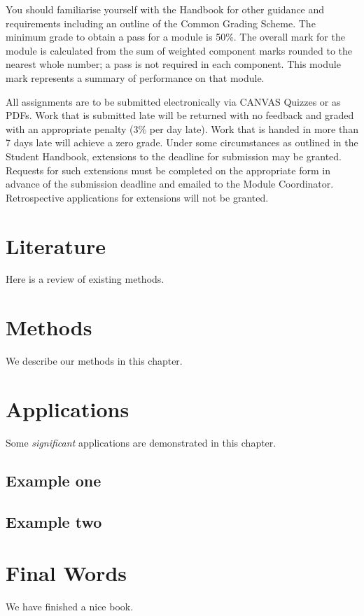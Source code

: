\documentclass[
]{book}
\begin{document}
You should familiarise yourself with the Handbook for other guidance and requirements including an outline of the Common Grading Scheme. The minimum grade to obtain a pass for a module is 50\%. The overall mark for the module is calculated from the sum of weighted component marks rounded to the nearest whole number; a pass is not required in each component. This module mark represents a summary of performance on that module.

All assignments are to be submitted electronically via CANVAS Quizzes or as PDFs. Work that is submitted late will be returned with no feedback and graded with an appropriate penalty (3\% per day late). Work that is handed in more than 7 days late will achieve a zero grade. Under some circumstances as outlined in the Student Handbook, extensions to the deadline for submission may be granted. Requests for such extensions must be completed on the appropriate form in advance of the submission deadline and emailed to the Module Coordinator. Retrospective applications for
extensions will not be granted.

\hypertarget{literature}{%
\chapter{Literature}\label{literature}}

Here is a review of existing methods.

\hypertarget{methods}{%
\chapter{Methods}\label{methods}}

We describe our methods in this chapter.

\hypertarget{applications}{%
\chapter{Applications}\label{applications}}

Some \emph{significant} applications are demonstrated in this chapter.

\hypertarget{example-one}{%
\section{Example one}\label{example-one}}

\hypertarget{example-two}{%
\section{Example two}\label{example-two}}

\hypertarget{final-words}{%
\chapter{Final Words}\label{final-words}}

We have finished a nice book.

\backmatter
  
\end{document}
